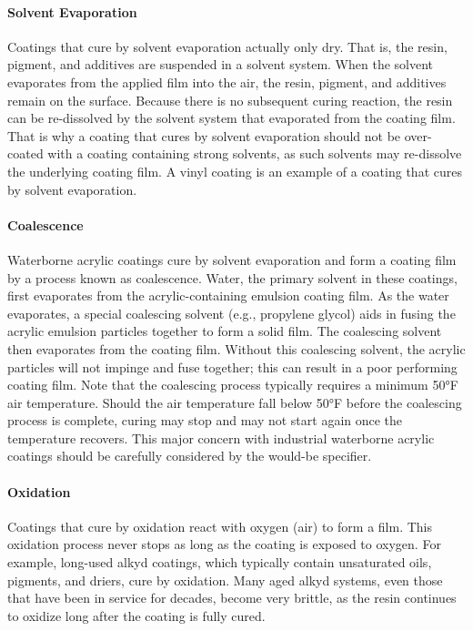 \paragraph{Solvent Evaporation}
Coatings that cure by solvent evaporation actually only dry. That is, the resin, pigment, and additives are
suspended in a solvent system. When the solvent evaporates from the applied film into the air, the resin, pigment, and
additives remain on the surface. Because there is no subsequent curing reaction, the resin can be re-dissolved by the
solvent system that evaporated from the coating film. That is why a coating that cures by solvent evaporation should
not be over-coated with a coating containing strong solvents, as such solvents may re-dissolve the underlying coating
film. A vinyl coating is an example of a coating that cures by solvent evaporation.
\paragraph{Coalescence}
Waterborne acrylic coatings cure by solvent evaporation and form a coating film by a process known as
coalescence. Water, the primary solvent in these coatings, first evaporates from the acrylic-containing emulsion
coating film. As the water evaporates, a special coalescing solvent (e.g., propylene glycol) aids in fusing the acrylic
emulsion particles together to form a solid film. The coalescing solvent then evaporates from the coating film.
Without this coalescing solvent, the acrylic particles will not impinge and fuse together; this can result in a poor
performing coating film. Note that the coalescing process typically requires a minimum 50°F air temperature. Should
the air temperature fall below 50°F before the coalescing process is complete, curing may stop and may not start
again once the temperature recovers. This major concern with industrial waterborne acrylic coatings should be
carefully considered by the would-be specifier.

\paragraph{Oxidation}
Coatings that cure by oxidation react with oxygen (air) to form a film. This oxidation process never stops as long
as the coating is exposed to oxygen. For example, long-used alkyd coatings, which typically contain unsaturated oils,
pigments, and driers, cure by oxidation. Many aged alkyd systems, even those that have been in service for decades,
become very brittle, as the resin continues to oxidize long after the coating is fully cured.
